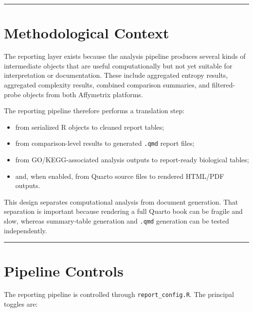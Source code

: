 \documentclass[
  letterpaper,
  DIV=11,
  numbers=noendperiod,
  openany,
  oneside]{scrreprt}
\providecommand{\tightlist}{%
  \setlength{\itemsep}{0pt}\setlength{\parskip}{0pt}}
\begin{document}
\begin{center}\rule{0.5\linewidth}{0.5pt}\end{center}

\section*{Methodological Context}\label{methodological-context}


The reporting layer exists because the analysis pipeline produces
several kinds of intermediate objects that are useful computationally
but not yet suitable for interpretation or documentation. These include
aggregated entropy results, aggregated complexity results, combined
comparison summaries, and filtered-probe objects from both Affymetrix
platforms.

The reporting pipeline therefore performs a translation step:

\begin{itemize}
\tightlist
\item
  from serialized R objects to cleaned report tables;
\item
  from comparison-level results to generated \texttt{.qmd} report files;
\item
  from GO/KEGG-associated analysis outputs to report-ready biological
  tables;
\item
  and, when enabled, from Quarto source files to rendered HTML/PDF
  outputs.
\end{itemize}

This design separates computational analysis from document generation.
That separation is important because rendering a full Quarto book can be
fragile and slow, whereas summary-table generation and \texttt{.qmd}
generation can be tested independently.

\begin{center}\rule{0.5\linewidth}{0.5pt}\end{center}

\section*{Pipeline Controls}\label{pipeline-controls-2}


The reporting pipeline is controlled through \texttt{report\_config.R}.
The principal toggles are:
\end{document}
